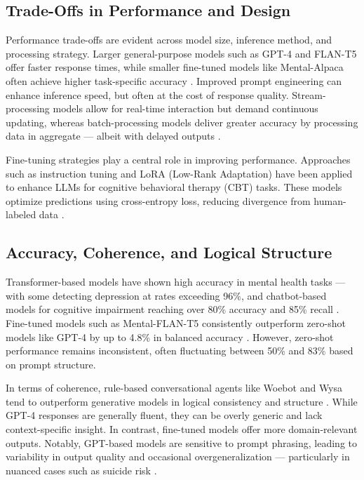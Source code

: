 \subsection{Trade-Offs in Performance and Design}

Performance trade-offs are evident across model size, inference method, and processing strategy. Larger general-purpose models such as GPT-4 and FLAN-T5 offer faster response times, while smaller fine-tuned models like Mental-Alpaca often achieve higher task-specific accuracy \cite{xu2024}. Improved prompt engineering can enhance inference speed, but often at the cost of response quality. Stream-processing models allow for real-time interaction but demand continuous updating, whereas batch-processing models deliver greater accuracy by processing data in aggregate — albeit with delayed outputs \cite{mcgorry2025}.

Fine-tuning strategies play a central role in improving performance. Approaches such as instruction tuning and LoRA (Low-Rank Adaptation) have been applied to enhance LLMs for cognitive behavioral therapy (CBT) tasks. These models optimize predictions using cross-entropy loss, reducing divergence from human-labeled data \cite{na2024}.

\subsection{Accuracy, Coherence, and Logical Structure}

Transformer-based models have shown high accuracy in mental health tasks — with some detecting depression at rates exceeding 96\%, and chatbot-based models for cognitive impairment reaching over 80\% accuracy and 85\% recall \cite{greco2023, mcgorry2025}. Fine-tuned models such as Mental-FLAN-T5 consistently outperform zero-shot models like GPT-4 by up to 4.8\% in balanced accuracy \cite{xu2024}. However, zero-shot performance remains inconsistent, often fluctuating between 50\% and 83\% based on prompt structure.

In terms of coherence, rule-based conversational agents like Woebot and Wysa tend to outperform generative models in logical consistency and structure \cite{stade2024}. While GPT-4 responses are generally fluent, they can be overly generic and lack context-specific insight. In contrast, fine-tuned models offer more domain-relevant outputs. Notably, GPT-based models are sensitive to prompt phrasing, leading to variability in output quality and occasional overgeneralization — particularly in nuanced cases such as suicide risk \cite{sejnowski2023}.

